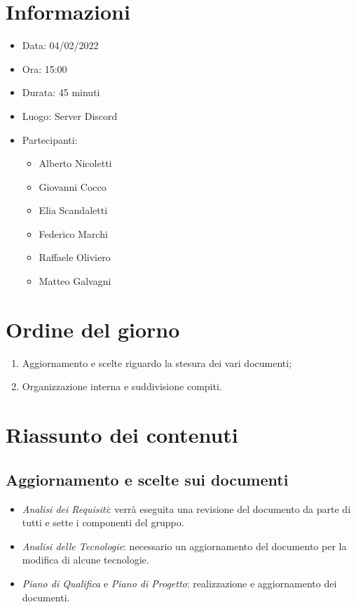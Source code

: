 \documentclass[a4paper, 12pt]{article}
\begin{document}
\makefrontpage

\section{Informazioni}

\begin{itemize}
\item Data: 04/02/2022
\item Ora: 15:00
\item Durata: 45 minuti
\item Luogo: Server Discord
\item Partecipanti:
\begin{itemize}
\item Alberto Nicoletti
\item Giovanni Cocco
\item Elia Scandaletti
\item Federico Marchi
\item Raffaele Oliviero
\item Matteo Galvagni
\end{itemize}
\end{itemize}

\section{Ordine del giorno}
\begin{enumerate}
    \item Aggiornamento e scelte riguardo la stesura dei vari documenti;
    \item Organizzazione interna e suddivisione compiti.
\end{enumerate}

\section{Riassunto dei contenuti}

\subsection{Aggiornamento e scelte sui documenti}
\begin{itemize}
    \item \textit{Analisi dei Requisiti}: verrà eseguita una revisione del documento da parte di tutti e sette i componenti del gruppo.
    \item \textit{Analisi delle Tecnologie}: necessario un aggiornamento del documento per la modifica di alcune tecnologie.
    \item \textit{Piano di Qualifica} e \textit{Piano di Progetto}: realizzazione e aggiornamento dei documenti.
\end{itemize}
\end{document}
